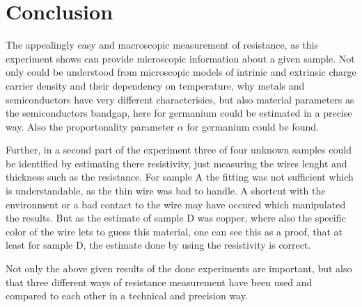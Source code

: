 
\section{Conclusion}
\label{sec:Conclusion}

The appealingly easy and macroscopic measurement of resistance, as this experiment shows can provide microscopic information about a given sample.
Not only could be understood from microscopic models of intrinic and extrinsic charge carrier density and their dependency on temperature, why metals and semiconductors have very different characterisics,
but also material parameters as the semiconductors bandgap, here for germanium could be estimated in a precise way.
Also the proportonality parameter $\alpha$ for germanium could be found.

Further, in a second part of the experiment three of four unknown samples could be identified by estimating there resistivity, just measuring the wires lenght and thickness such as the resistance.
For sample A the fitting was not sufficient which is understandable, as the thin wire was bad to handle.
A shortcut with the environment or a bad contact to the wire may have occured  which manipulated the results.
But as the estimate of sample D was copper, where also the specific color of the wire lets to guess this material, one can see this as a proof, that at least for sample D, the estimate done by using the resistivity is correct.

Not only the above given results of the done experiments are important, but also that three different ways of resistance measurement have been used and compared to each other in a technical and precision way.


